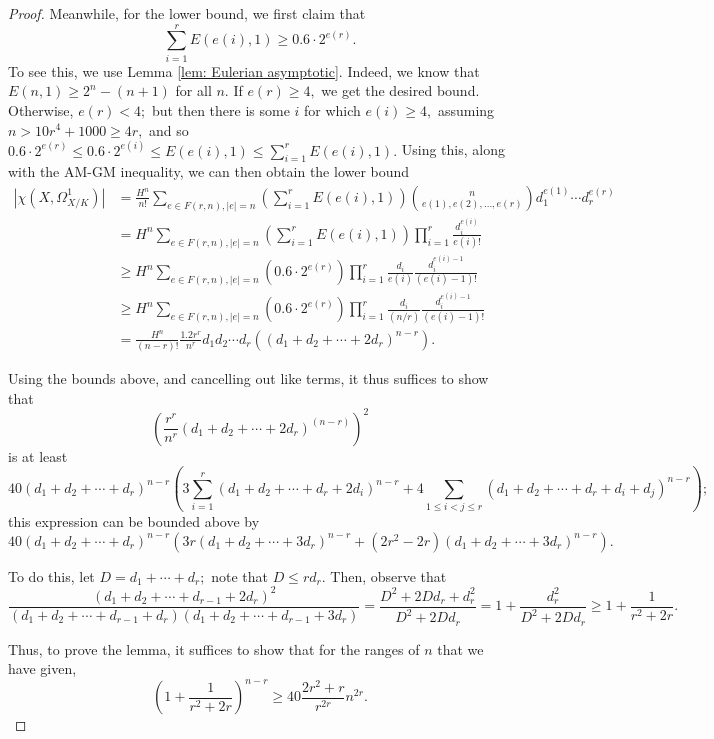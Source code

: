 \documentclass{article}
\theoremstyle{definition}
\theoremstyle{remark}
\begin{document}
\begin{proof}
\par Meanwhile, for the lower bound, we first claim that $$\sum\limits_{i=1}^r E(e(i), 1) \geq 0.6 \cdot 2^{e(r)}.$$ To see this, we use Lemma \ref{lem: Eulerian asymptotic}. Indeed, we know that $E(n, 1) \geq 2^n - (n+1)$ for all $n.$ If $e(r) \geq 4,$ we get the desired bound. Otherwise, $e(r) < 4;$ but then there is some $i$ for which $e(i) \geq 4,$ assuming $n > 10r^4 + 1000 \geq 4r,$ and so $0.6 \cdot 2^{e(r)} \leq 0.6 \cdot 2^{e(i)} \leq E(e(i), 1) \leq \sum\limits_{i=1}^r E(e(i), 1).$ Using this, along with the AM-GM inequality, we can then obtain the lower bound \begin{align*} |\chi(X, \Omega^1_{X/K})| & = \frac{H^n}{n!} \sum\limits_{e \in F(r, n), |e| = n} \left(\sum\limits_{i=1}^r E(e(i), 1)\right)\binom{n}{e(1), e(2), \ldots, e(r)}d_1^{e(1)} \cdots d_r^{e(r)} \\ & = H^n \sum\limits_{e \in F(r, n), |e| = n} \left(\sum\limits_{i=1}^r E(e(i), 1)\right)\prod\limits_{i=1}^r \frac{d_i^{e(i)}}{e(i)!} \\ & \geq H^n \sum\limits_{e \in F(r, n), |e| = n} \left(0.6 \cdot 2^{e(r)}\right)\prod\limits_{i=1}^r \frac{d_i}{e(i) }\frac{d_i^{e(i) - 1}}{(e(i) - 1)!} \\ & \geq H^n \sum\limits_{e \in F(r, n), |e| = n} \left(0.6 \cdot 2^{e(r)}\right)\prod\limits_{i=1}^r \frac{d_i}{(n/r)} \frac{d_i^{e(i) - 1}}{(e(i) - 1)!} \\ & = \frac{H^n}{(n-r)!}\frac{1.2 r^r}{n^r} d_1d_2 \cdots d_r \left((d_1 + d_2 + \cdots + 2d_r)^{n-r}\right).
\end{align*}
\par Using the bounds above, and cancelling out like terms, it thus suffices to show that $$\left(\frac{r^r}{n^r} (d_1 + d_2 + \cdots + 2d_r)^{(n-r)}\right)^2$$ is at least \[40 (d_1 + d_2 + \cdots + d_r)^{n-r} \left(3\sum\limits_{i=1}^r (d_1 + d_2 + \cdots + d_r + 2d_i)^{n-r} + 4\sum\limits_{1 \leq i < j \leq r} (d_1 + d_2 + \cdots + d_r + d_i + d_j)^{n-r}\right);\] this expression can be bounded above by \[40 (d_1 + d_2 + \cdots + d_r)^{n-r} \left(3r (d_1 + d_2 + \cdots + 3d_r )^{n-r} + (2r^2 - 2r) (d_1 + d_2 + \cdots + 3d_r)^{n-r}\right).\]
\par To do this, let $D = d_1 + \cdots + d_r;$ note that $D \leq rd_r.$ Then, observe that $$\frac{(d_1 + d_2 + \cdots + d_{r-1} + 2d_r)^2}{(d_1 + d_2 + \cdots + d_{r-1} + d_r)(d_1 + d_2 + \cdots + d_{r-1} + 3d_r)} = \frac{D^2 + 2Dd_r + d_r^2}{D^2 + 2Dd_r} = 1 + \frac{d_r^2}{D^2 + 2Dd_r} \geq 1 + \frac{1}{r^2 + 2r}.$$
\par Thus, to prove the lemma, it suffices to show that for the ranges of $n$ that we have given, $$\left(1 + \frac{1}{r^2 + 2r}\right)^{n-r} \geq 40\frac{2r^2 + r}{r^{2r}} n^{2r}.$$

\end{proof}
\end{document}

